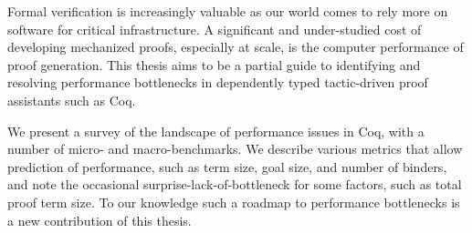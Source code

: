 %
%
%
%
%
%
Formal verification is increasingly valuable as our world comes to rely more on software for critical infrastructure.
A significant and under-studied cost of developing mechanized proofs, especially at scale, is the computer performance of proof generation.
This thesis aims to be a partial guide to identifying and resolving performance bottlenecks in dependently typed tactic-driven proof assistants such as Coq.

We present a survey of the landscape of performance issues in Coq, with a number of micro- and macro-benchmarks.
We describe various metrics that allow prediction of performance, such as term size, goal size, and number of binders, and note the occasional surprise-lack-of-bottleneck for some factors, such as total proof term size.
To our knowledge such a roadmap to performance bottlenecks is a new contribution of this thesis.

